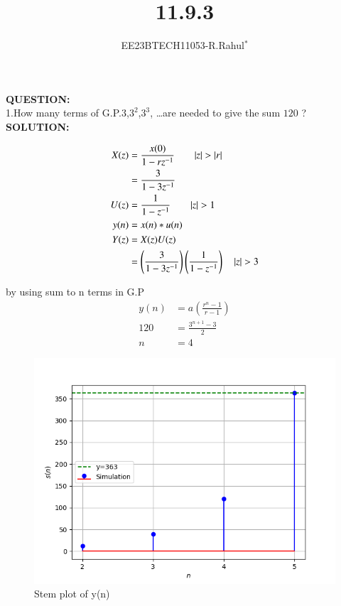 \documentclass[journal,12pt,twocolumn]{IEEEtran}
\theoremstyle{remark}
\begin{document}

\vspace{3cm}
\title{\textbf{11.9.3}}
\author{EE23BTECH11053-R.Rahul$^{*}$%
}
\maketitle
\newpage
\bigskip

\textbf{QUESTION:}\\
1.How many terms of G.P.$3$,$3^2$,$3^3$, \ldots are needed to give the sum $120$ ?\\

\textbf{SOLUTION:}\\
\vspace{-0.25cm}

\begin{center}
    
\begin{align}
      X(z)&=\frac{x(0)}{1-rz^{-1}} \qquad |z|>|r|\\
      &=\frac{3}{1-3z^{-1}}\\
      U(z)&=\frac{1}{1-z^{-1}} \qquad |z|>1\\
      y(n)&= x(n)*u(n)\\
      Y(z)&=X(z)U(z)\\
&=\brak{ \frac{3}{1-3z^{-1}}}\brak{\frac{1}{1-z^{-1}}}\quad|z| > 3 \end{align}
\end{center}
by using sum to n terms in G.P
\begin{align}
    y(n)&=a(\frac{r^{n}-1}{r-1})\\
    120&=\frac{3^{n+1}-3}{2}\\
    n&=4
\end{align}
\begin{figure}[h]
  
  \includegraphics[width=\columnwidth]{figs/graph.png}
  \caption{Stem plot of y(n)}
  \label{fig:your_label}
\end{figure}
\end{document}
